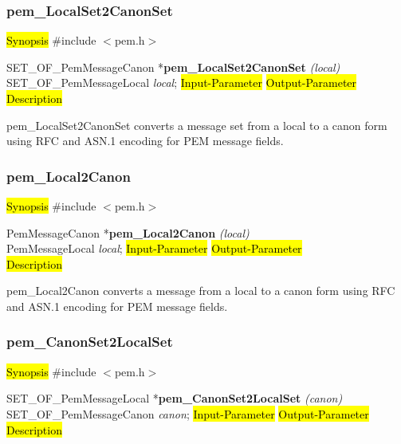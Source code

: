 \subsubsection{pem\_LocalSet2CanonSet}
\label{pem_LocalSet2CanonSet}
\hl{Synopsis}
\#include $<$pem.h$>$ 

SET\_OF\_PemMessageCanon *{\bf pem\_LocalSet2CanonSet} {\em (local)} \\
SET\_OF\_PemMessageLocal {\em *local};
\hl{Input-Parameter}
\hl{Output-Parameter}
 \\
\hl{Description}

pem\_LocalSet2CanonSet converts a message set from a local to a canon form
using RFC and ASN.1 encoding for PEM message fields.







\subsubsection{pem\_Local2Canon}
\label{pem_Local2Canon}
\hl{Synopsis}
\#include $<$pem.h$>$ 

PemMessageCanon *{\bf pem\_Local2Canon} {\em (local)} \\
PemMessageLocal {\em *local};
\hl{Input-Parameter}
\hl{Output-Parameter}
 \\
\hl{Description}

pem\_Local2Canon converts a message from a local to a canon form
using RFC and ASN.1 encoding for PEM message fields.





\subsubsection{pem\_CanonSet2LocalSet}
\label{pem_CanonSet2LocalSet}
\hl{Synopsis}
\#include $<$pem.h$>$ 

SET\_OF\_PemMessageLocal *{\bf pem\_CanonSet2LocalSet} {\em (canon)} \\
SET\_OF\_PemMessageCanon {\em *canon};
\hl{Input-Parameter}
\hl{Output-Parameter}
 \\
\hl{Description}

